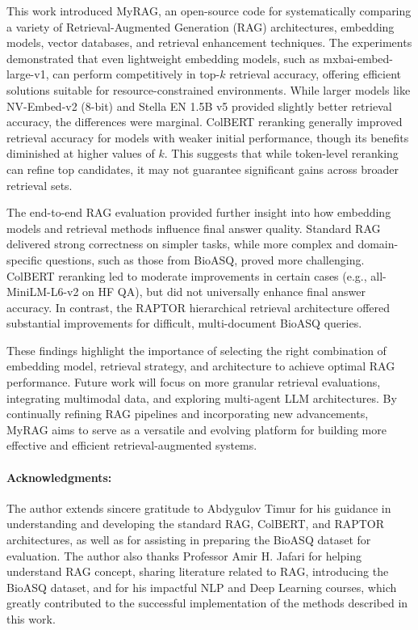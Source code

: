 \documentclass{scrartcl}
\begin{document}
This work introduced MyRAG, an open-source code for systematically comparing a variety of Retrieval-Augmented Generation (RAG) architectures, embedding models, vector databases, and retrieval enhancement techniques. The experiments demonstrated that even lightweight embedding models, such as mxbai-embed-large-v1, can perform competitively in top-$k$ retrieval accuracy, offering efficient solutions suitable for resource-constrained environments. While larger models like NV-Embed-v2 (8-bit) and Stella EN 1.5B v5 provided slightly better retrieval accuracy, the differences were marginal. ColBERT reranking generally improved retrieval accuracy for models with weaker initial performance, though its benefits diminished at higher values of $k$. This suggests that while token-level reranking can refine top candidates, it may not guarantee significant gains across broader retrieval sets.

The end-to-end RAG evaluation provided further insight into how embedding models and retrieval methods influence final answer quality. Standard RAG delivered strong correctness on simpler tasks, while more complex and domain-specific questions, such as those from BioASQ, proved more challenging. ColBERT reranking led to moderate improvements in certain cases (e.g., all-MiniLM-L6-v2 on HF QA), but did not universally enhance final answer accuracy. In contrast, the RAPTOR hierarchical retrieval architecture offered substantial improvements for difficult, multi-document BioASQ queries.

These findings highlight the importance of selecting the right combination of embedding model, retrieval strategy, and architecture to achieve optimal RAG performance. Future work will focus on more granular retrieval evaluations, integrating multimodal data, and exploring multi-agent LLM architectures. By continually refining RAG pipelines and incorporating new advancements, MyRAG aims to serve as a versatile and evolving platform for building more effective and efficient retrieval-augmented systems.

\paragraph{Acknowledgments:} The author extends sincere gratitude to Abdygulov Timur for his guidance in understanding and developing the standard RAG, ColBERT, and RAPTOR architectures, as well as for assisting in preparing the BioASQ dataset for evaluation. The author also thanks Professor Amir H. Jafari for helping understand RAG concept, sharing literature related to RAG, introducing the BioASQ dataset,  and for his impactful NLP and Deep Learning courses, which greatly contributed to the successful implementation of the methods described in this work.




\end{document}
